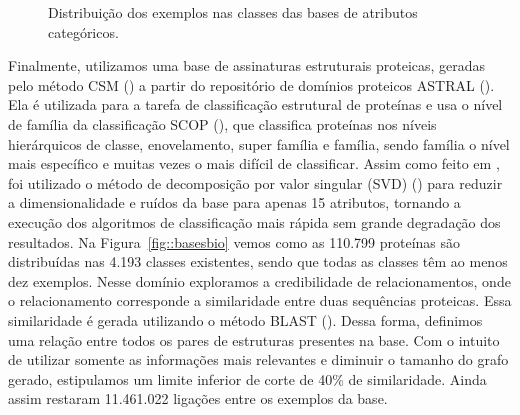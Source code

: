 \begin{figure}[h]

\caption{Distribuição dos exemplos nas classes das bases de atributos categóricos.}
\label{fig::basescategorias}
\end{figure}

Finalmente, utilizamos uma base de assinaturas estruturais proteicas, geradas pelo método \textsc{CSM} (\cite{dpires_bmc_2011}) a partir do repositório de domínios proteicos ASTRAL (\cite{Brenner00}).
Ela é utilizada para a tarefa de classificação estrutural de proteínas e usa o nível de família da classificação \textsc{SCOP} (\cite{SCOP95}), que classifica proteínas nos níveis hierárquicos de classe, enovelamento, super família e família, sendo família o nível mais específico e muitas vezes o mais difícil de classificar. Assim como feito em \cite{dpires_bmc_2011}, foi utilizado o método de decomposição por valor singular (\textsc{SVD}) (\cite{SVD}) para reduzir a dimensionalidade e ruídos da base para apenas 15 atributos, tornando a execução dos algoritmos de classificação mais rápida sem grande degradação dos resultados.
Na Figura~\ref{fig::basesbio} vemos como as 110.799 proteínas são distribuídas nas 4.193 classes existentes, sendo que todas as classes têm ao menos dez exemplos.
Nesse domínio exploramos a credibilidade de relacionamentos, onde o relacionamento corresponde a similaridade entre duas sequências proteicas. Essa similaridade é gerada utilizando o método \textsc{BLAST} (\cite{altschul90}). Dessa forma, definimos uma relação entre todos os pares de estruturas presentes na base. Com o intuito de utilizar somente as informações mais relevantes e diminuir o tamanho do grafo gerado, estipulamos um limite inferior de corte de 40\% de similaridade. Ainda assim restaram 11.461.022 ligações entre os exemplos da base.

